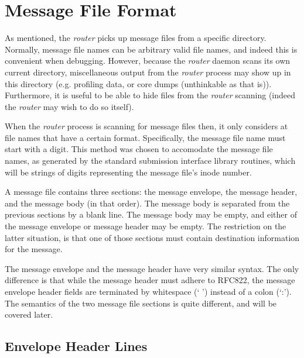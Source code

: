 
\section{Message File Format}
\label{msg_file_format}

As mentioned, the {\em router} picks up message files from a specific directory.
Normally, message file names can be arbitrary valid file names, and indeed
this is convenient when debugging.  However, because the {\em router} daemon
scans its own current directory, miscellaneous output from the {\em router}
process may show up in this directory (e.g. profiling data, or core dumps
(unthinkable as that is)).  Furthermore, it is useful to be able to hide
files from the {\em router} scanning (indeed the {\em router} may wish to do so
itself).

When the {\em router} process is scanning for message files then, it only
considers at file names that have a certain format.  Specifically, the
message file name must start with a digit.  This method was chosen to
accomodate the message file names, as generated by the standard submission
interface library routines, which will be strings of digits representing
the message file's inode number.

A message file contains three sections: the message envelope, the message
header, and the message body (in that order).  The message body is
separated from the previous sections by a blank line.  The message body may
be empty, and either of the message envelope or message header may be
empty.  The restriction on the latter situation, is that one of those
sections must contain destination information for the message.

The message envelope and the message header have very similar syntax.  The
only difference is that while the message header must adhere to RFC822, the
message envelope header fields are terminated by whitespace (` ') instead
of a colon (`:').  The semantics of the two message file sections is quite
different, and will be covered later.




\subsection{Envelope Header Lines}



